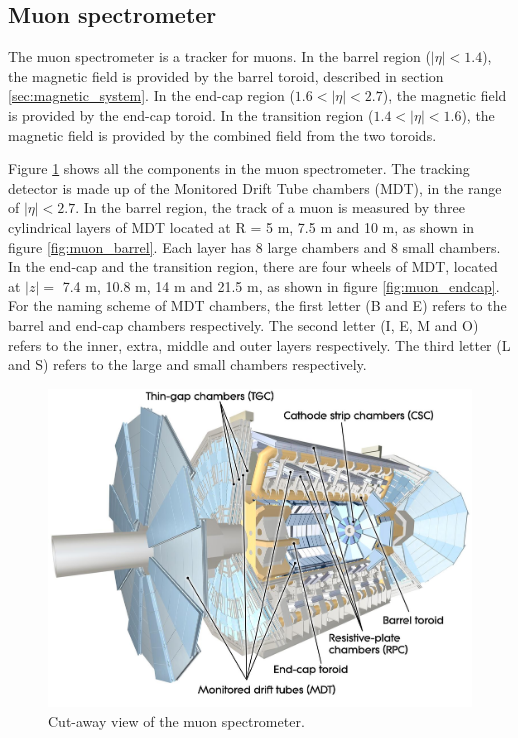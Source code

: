 \subsection{Muon spectrometer}
The muon spectrometer is a tracker for muons.
In the barrel region ($|\eta| < 1.4$), the magnetic field is provided by the barrel toroid, described in section \ref{sec:magnetic_system}.
In the end-cap region ($1.6 < |\eta| < 2.7$), the magnetic field is provided by the end-cap toroid.
In the transition region ($1.4 < |\eta| < 1.6$), the magnetic field is provided by the combined field from the two toroids.

Figure \ref{fig:muon_spectrometer} shows all the components in the muon spectrometer.
The tracking detector is made up of the Monitored Drift Tube chambers (MDT), in the range of $|\eta| < 2.7$.
In the barrel region, the track of a muon is measured by three cylindrical layers of MDT located at R = 5 m, 7.5 m and 10 m, as shown in figure \ref{fig:muon_barrel}.
Each layer has 8 large chambers and 8 small chambers.
In the end-cap and the transition region, there are four wheels of MDT, located at $|z|=$ 7.4 m, 10.8 m, 14 m and 21.5 m, as shown in figure \ref{fig:muon_endcap}.
For the naming scheme of MDT chambers, the first letter (B and E) refers to the barrel and end-cap chambers respectively.
The second letter (I, E, M and O) refers to the inner, extra, middle and outer layers respectively.
The third letter (L and S) refers to the large and small chambers respectively.

\begin{figure}
\centering
\includegraphics[width=\textwidth]{data/photo/detector/muon_spectrometer.jpg}
\caption{Cut-away view of the muon spectrometer. \cite{muon_spectrometer}}
\label{fig:muon_spectrometer}
\end{figure}

